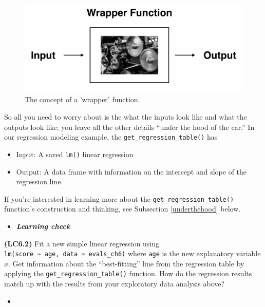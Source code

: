 \documentclass[12pt,]{krantz}
\providecommand{\tightlist}{%
  \setlength{\itemsep}{0pt}\setlength{\parskip}{0pt}}
\newenvironment{rmdblock}[1]
  {\begin{shaded*}
  \begin{itemize}
  \renewcommand{\labelitemi}{
    \raisebox{-.7\height}[0pt][0pt]{
    }
  }
  \item
  }
  {
  \end{itemize}
  \end{shaded*}
  }
\newenvironment{learncheck}
  {\begin{rmdblock}{warning}}
  {\end{rmdblock}}
\begin{document}
\begin{figure}

{\centering \includegraphics[width=\textwidth]{images/flowcharts/flowchart.011-cropped} 

}

\caption{The concept of a 'wrapper' function.}\label{fig:moderndive-figure-wrapper}
\end{figure}

So all you need to worry about is the what the inputs look like and what
the outputs look like; you leave all the other details ``under the hood
of the car.'' In our regression modeling example, the
\texttt{get\_regression\_table()} has

\begin{itemize}
\tightlist
\item
  Input: A saved \texttt{lm()} linear regression
\item
  Output: A data frame with information on the intercept and slope of
  the regression line.
\end{itemize}

If you're interested in learning more about the
\texttt{get\_regression\_table()} function's construction and thinking,
see Subsection \ref{underthehood} below.

\begin{learncheck}
\textbf{\emph{Learning check}}
\end{learncheck}

\textbf{(LC6.2)} Fit a new simple linear regression using
\texttt{lm(score\ \textasciitilde{}\ age,\ data\ =\ evals\_ch6)} where
\texttt{age} is the new explanatory variable \(x\). Get information
about the ``best-fitting'' line from the regression table by applying
the \texttt{get\_regression\_table()} function. How do the regression
results match up with the results from your exploratory data analysis
above?

\begin{learncheck}

\end{learncheck}
\end{document}
